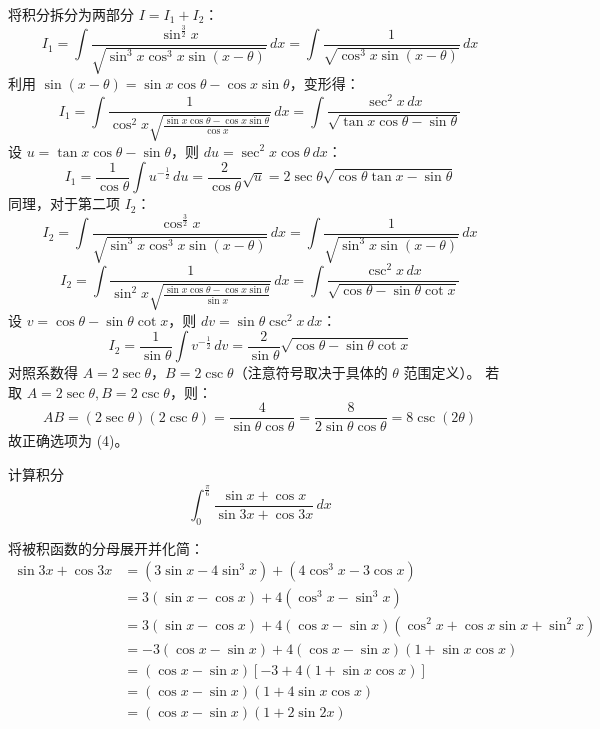 \begin{questions}
\begin{solution}
将积分拆分为两部分 $I = I_1 + I_2$：
\[
I_1 = \int \frac{\sin^{\frac{3}{2}} x}{\sqrt{\sin^3 x \cos^3 x \sin(x-\theta)}} \,dx = \int \frac{1}{\sqrt{\cos^3 x \sin(x-\theta)}} \,dx
\]
利用 $\sin(x-\theta) = \sin x \cos \theta - \cos x \sin \theta$，变形得：
\[
I_1 = \int \frac{1}{\cos^2 x \sqrt{\frac{\sin x \cos \theta - \cos x \sin \theta}{\cos x}}} \,dx = \int \frac{\sec^2 x \,dx}{\sqrt{\tan x \cos \theta - \sin \theta}}
\]
设 $u = \tan x \cos \theta - \sin \theta$，则 $du = \sec^2 x \cos \theta \,dx$：
\[
I_1 = \frac{1}{\cos \theta} \int u^{-\frac{1}{2}} \,du = \frac{2}{\cos \theta} \sqrt{u} = 2 \sec \theta \sqrt{\cos \theta \tan x - \sin \theta}
\]
同理，对于第二项 $I_2$：
\[
I_2 = \int \frac{\cos^{\frac{3}{2}} x}{\sqrt{\sin^3 x \cos^3 x \sin(x-\theta)}} \,dx = \int \frac{1}{\sqrt{\sin^3 x \sin(x-\theta)}} \,dx
\]
\[
I_2 = \int \frac{1}{\sin^2 x \sqrt{\frac{\sin x \cos \theta - \cos x \sin \theta}{\sin x}}} \,dx = \int \frac{\csc^2 x \,dx}{\sqrt{\cos \theta - \sin \theta \cot x}}
\]
设 $v = \cos \theta - \sin \theta \cot x$，则 $dv = \sin \theta \csc^2 x \,dx$：
\[
I_2 = \frac{1}{\sin \theta} \int v^{-\frac{1}{2}} \,dv = \frac{2}{\sin \theta} \sqrt{\cos \theta - \sin \theta \cot x}
\]
对照系数得 $A = 2 \sec \theta$，$B = 2 \csc \theta$（注意符号取决于具体的 $\theta$ 范围定义）。
若取 $A = 2 \sec \theta, B = 2 \csc \theta$，则：
\[
AB = (2 \sec \theta)(2 \csc \theta) = \frac{4}{\sin \theta \cos \theta} = \frac{8}{2 \sin \theta \cos \theta} = 8 \csc(2\theta)
\]
故正确选项为 (4)。
\end{solution}

\question 计算积分
\[
\int_0^{\frac{\pi}{6}} \frac{\sin x + \cos x}{\sin 3x + \cos 3x} \,dx
\]

\begin{solution}
将被积函数的分母展开并化简：
\begin{align*}
\sin 3x + \cos 3x &= (3\sin x - 4\sin^3 x) + (4\cos^3 x - 3\cos x) \\
&= 3(\sin x - \cos x) + 4(\cos^3 x - \sin^3 x) \\
&= 3(\sin x - \cos x) + 4(\cos x - \sin x)(\cos^2 x + \cos x \sin x + \sin^2 x) \\
&= -3(\cos x - \sin x) + 4(\cos x - \sin x)(1 + \sin x \cos x) \\
&= (\cos x - \sin x) \left[ -3 + 4(1 + \sin x \cos x) \right] \\
&= (\cos x - \sin x) (1 + 4\sin x \cos x) \\
&= (\cos x - \sin x) (1 + 2\sin 2x)
\end{align*}


\end{solution}
\end{questions}
